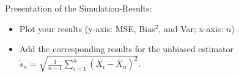 \documentclass[a4paper]{article}
\begin{document}
\bigskip

{\sc Presentation of the Simulation-Results:}
\begin{itemize}[leftmargin=0.3cm]
\item Plot your results (y-axis: MSE, Bias$^2$, and Var; x-axis: $n$)
\item Add the corresponding results for the unbiased estimator $\tilde{s}_{n}=\sqrt{\frac{1}{n-1}\sum_{i=1}^n(X_i-\bar{X}_n)^2}$.
\end{itemize}
\end{document}
